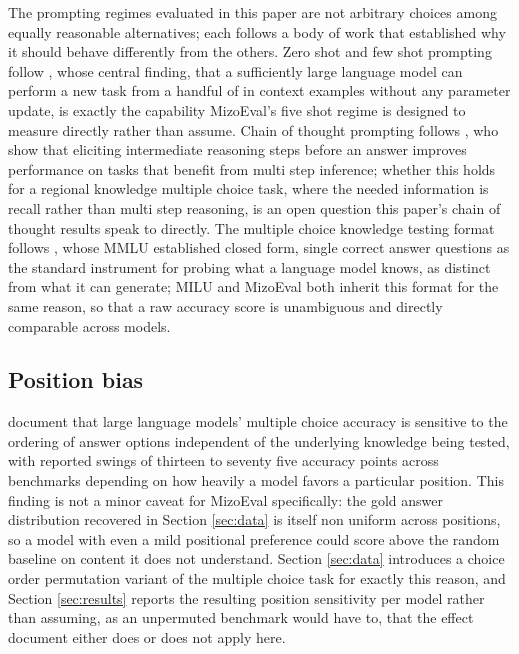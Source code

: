 \documentclass[pdflatex,sn-mathphys-ay]{sn-jnl}
\begin{document}
The prompting regimes evaluated in this paper are not arbitrary choices among equally reasonable alternatives; each follows a body of work that established why it should behave differently from the others. Zero shot and few shot prompting follow \citet{brown2020fewshot}, whose central finding, that a sufficiently large language model can perform a new task from a handful of in context examples without any parameter update, is exactly the capability MizoEval's five shot regime is designed to measure directly rather than assume. Chain of thought prompting follows \citet{wei2022chainofthought}, who show that eliciting intermediate reasoning steps before an answer improves performance on tasks that benefit from multi step inference; whether this holds for a regional knowledge multiple choice task, where the needed information is recall rather than multi step reasoning, is an open question this paper's chain of thought results speak to directly. The multiple choice knowledge testing format follows \citet{hendrycks2021mmlu}, whose MMLU established closed form, single correct answer questions as the standard instrument for probing what a language model knows, as distinct from what it can generate; MILU and MizoEval both inherit this format for the same reason, so that a raw accuracy score is unambiguous and directly comparable across models.

\subsection{Position bias}

\citet{pezeshkpour2024positionbias} document that large language models' multiple choice accuracy is sensitive to the ordering of answer options independent of the underlying knowledge being tested, with reported swings of thirteen to seventy five accuracy points across benchmarks depending on how heavily a model favors a particular position. This finding is not a minor caveat for MizoEval specifically: the gold answer distribution recovered in Section \ref{sec:data} is itself non uniform across positions, so a model with even a mild positional preference could score above the random baseline on content it does not understand. Section \ref{sec:data} introduces a choice order permutation variant of the multiple choice task for exactly this reason, and Section \ref{sec:results} reports the resulting position sensitivity per model rather than assuming, as an unpermuted benchmark would have to, that the effect \citet{pezeshkpour2024positionbias} document either does or does not apply here.
\end{document}
